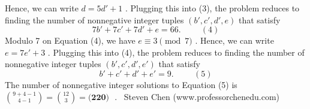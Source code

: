 \documentclass[12pt]{article}
\begin{document}
Hence, we can write $d = 5 d' + 1$ . Plugging this into (3), the problem reduces to finding the number of
nonnegative integer tuples $\left( b' , c' , d' , e \right)$ that satisfy \[ 7 b' + 7 c' + 7 d' + e = 66 . \hspace{1cm} (4) \] Modulo 7 on Equation (4), we have $e \equiv 3 \pmod{7}$ .
Hence, we can write $e = 7 e' + 3$ . Plugging this into (4), the problem reduces to finding the number of
nonnegative integer tuples $\left( b' , c' , d' , e' \right)$ that satisfy \[ b' + c' + d' + e' = 9 . \hspace{1cm} (5) \] The number of nonnegative integer solutions to Equation (5) is $\binom{9 + 4 - 1}{4 - 1} = \binom{12}{3} = \boxed{\textbf{(220) }}$ . ~Steven Chen (www.professorchenedu.com)
\end{document}
